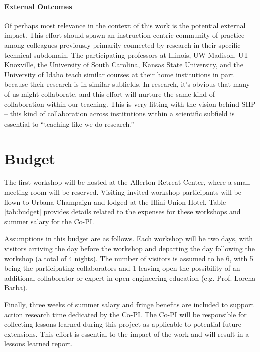 \documentclass[11pt]{article}
\begin{document}
          \paragraph{External Outcomes} Of perhaps most relevance in the
          context of this work is the potential external impact. This effort
          should spawn an instruction-centric community of practice among
          colleagues previously primarily connected by research 
          in their specific technical subdomain. 
          The participating professors at Illinois, UW Madison, UT Knoxville, 
          the University of South Carolina, Kansas State University, and the 
          University of Idaho teach similar courses at their home institutions 
          in part because their research is in similar subfields. In research, 
          it's obvious that many of us might collaborate, and this effort will 
          nurture the same kind of collaboration within our teaching. This is 
          very fitting with the vision behind SIIP -- this kind of collaboration 
          across institutions within a scientific subfield is essential to 
          ``teaching like we do research.'' 

          \section{Budget}
          The first workshop will be hosted at the Allerton Retreat Center, 
          where a small meeting room will be reserved. Visiting 
          invited workshop participants will be flown to Urbana-Champaign and 
          lodged at the Illini Union Hotel. Table \ref{tab:budget} provides 
          details related to the expenses for these workshops and summer salary 
          for the Co-PI.

          Assumptions in this budget are as follows. Each workshop will be two 
          days, with visitors arriving the day before the workshop and 
          departing the day following the workshop (a total of 4 nights). The 
          number of visitors is assumed to be 6, with 5 being the participating 
          collaborators and 1 leaving open the possibility of an additional 
          collaborator or expert in open engineering education (e.g. Prof. 
          Lorena Barba). 
          
          Finally, three weeks of summer salary and fringe 
          benefits are included to support action research time dedicated by 
          the Co-PI. The Co-PI will be responsible for collecting lessons 
          learned during this project as applicable to potential future 
          extensions. This effort is essential to the impact of the work and 
          will result in a lessons learned report.
\end{document}
